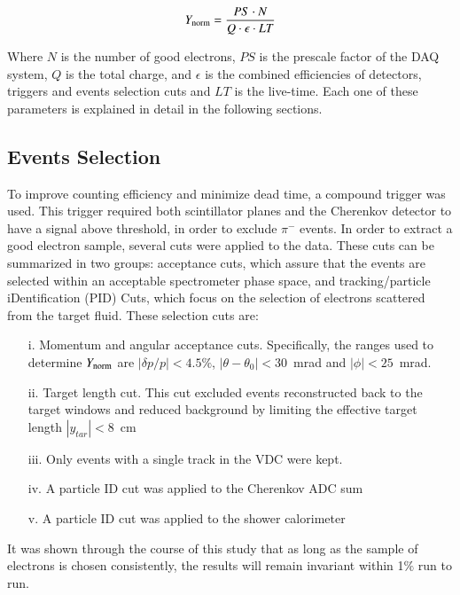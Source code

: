 \documentclass[final,5p,times,twocolumn]{elsarticle}
\begin{document}
\begin{equation}
Y_{\rm{norm}} = \frac{PS \cdot N}{ Q \cdot \epsilon \cdot LT }
\label{eq:yield}
\end{equation}

\noindent Where $N$ is the number of good electrons, $PS$ is the prescale factor of the DAQ system, 
$Q$ is the total charge, and $\epsilon $ is the combined efficiencies of detectors, triggers 
and events selection cuts and $LT$ is the live-time. Each one of these parameters is explained 
in detail in the following sections.

\subsection{Events Selection}
To improve counting efficiency and minimize dead time, a compound trigger was used. This trigger required both scintillator planes 
and the Cherenkov detector to have a signal above threshold, in order to exclude $\pi^{-}$ events. In order to extract a good 
electron sample, several cuts were applied to the data. These cuts can be summarized in two groups: acceptance cuts, which 
assure that the events are selected within an acceptable spectrometer phase space, and 
tracking/particle iDentification (PID) Cuts, which focus on the selection of electrons scattered from the target fluid.
These selection cuts are:

\begin{itemize}
\item[i.] Momentum and angular acceptance cuts. Specifically, the ranges used to determine $Y_{\rm{norm}}$ are $|\delta p/p| < 4.5\%$,  
$|\theta-\theta_{0}| < 30$~mrad and $|\phi| < 25$~mrad.

\item[ii.] Target length cut. This cut excluded events reconstructed back to the target windows 
and reduced background by limiting the effective target length $|y_{tar}|<8$~cm 

\item[iii.] Only events with a single track in the VDC were kept.

\item[iv.] A particle ID cut was applied to the Cherenkov ADC sum

\item[v.] A particle ID cut was applied to the shower calorimeter

\end{itemize}

It was shown through the course of this study that as long as the sample of electrons is chosen consistently, 
the results will remain invariant within 1$\%$ run to run.
\end{document}
